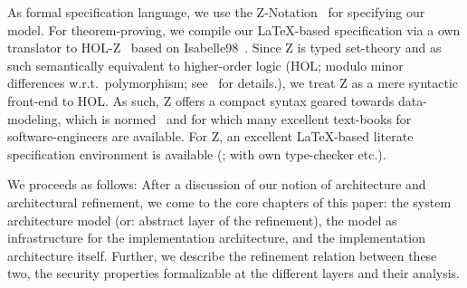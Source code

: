 As formal specification language, we use the Z-Notation~\cite{iso:z:2000} 
for specifying our model. For theorem-proving, we compile our
\LaTeX-based specification via a own translator to 
HOL-Z~\cite{kolyang.ea:hol:96,brucker.ea:hol-z:2002} based on
Isabelle98~\cite{paulson:isabelle:1994,nipkow.ea:isabelle:2002}.  Since Z is typed set-theory
and as such semantically equivalent to higher-order logic (HOL; modulo
minor differences w.r.t.\ polymorphism; see~\cite{santen:HOL:1998} for
details.), we treat Z as a mere syntactic front-end to HOL\@. As such,
Z offers a compact syntax geared towards data-modeling, which is
normed~\cite{iso:z:2000} and for which many excellent text-books for
software-engineers are available. For Z, an excellent \LaTeX-based
literate specification environment is available (\cite{zeta}; with own
type-checker etc.).

We proceeds as follows: After a discussion of our notion of
architecture and architectural refinement, we come to the core
chapters of this paper: the system architecture model (or: abstract
layer of the refinement), the \unix{} model as infrastructure for the
implementation architecture, and the implementation architecture
itself. Further, we describe the refinement relation between these
two, the security properties formalizable at the different layers and
their analysis.

